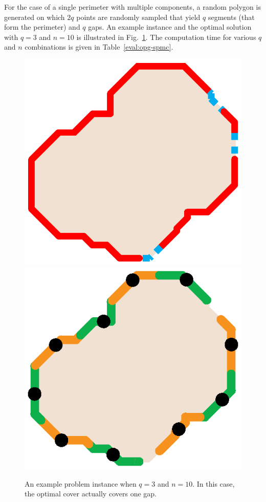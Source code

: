 For the case of a single perimeter with multiple components, a random 
polygon is generated on which $2q$ points are randomly sampled that 
yield $q$ segments (that form the perimeter) and $q$ gaps. An example 
instance and the optimal solution with $q=3$ and $n = 10$ is illustrated 
in Fig.~\ref{fig:opg-spmc-example}. The computation time for various $q$ and 
$n$ combinations is given in Table~\ref{eval:opg-spmc}.
\begin{figure}[ht!]
    \vspace*{-3mm}
    \centering
    \includegraphics[keepaspectratio, scale=0.4]{./chapters/opg/figures/spmc-example.eps}
    \includegraphics[keepaspectratio, scale=0.4]{./chapters/opg/figures/spmc-solution.eps}
    \vspace*{-3mm}
    \caption{\label{fig:opg-spmc-example} 
    An example problem instance when $q = 3$ and $n = 10$. In this case, the 
		optimal cover actually covers one gap.}
    \vspace*{-4mm}
\end{figure}

